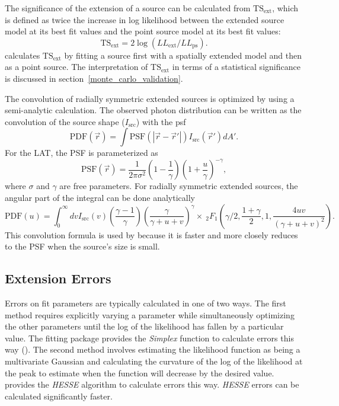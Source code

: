\documentclass[12pt,preprint]{aastex}
\newcommand{\tsext}{{\ensuremath{\text{TS}_\text{ext}}}\xspace}
\newcommand{\pointlike}{\text{\em pointlike}\xspace}
\newcommand{\minuit}{\text{\em Minuit}\xspace}
\begin{document}
The significance of the extension of a source can be calculated from
\tsext, which is defined as twice the increase in log likelihood between
the extended source model at its best fit values and the point source
model at its best fit values:
\begin{equation}
  \tsext=2\log(LL_\text{ext}/LL_\text{ps}).
\end{equation}
\pointlike calculates \tsext by fitting a source first with a spatially
extended model and then as a point source.  The interpretation
of \tsext in terms of a statistical significance is discussed in
section~\ref{monte_carlo_validation}.

The convolution of radially symmetric extended sources is optimized by
using a semi-analytic calculation.  The observed photon distribution
can be written as the convolution of the source shape ($I_\text{src}$)
with the psf
\begin{equation}
  \text{PDF}(\vec r) = \int  \text{PSF}(|\vec r - \vec r'|)I_\text{src}(\vec r') d A'.
\end{equation}
For the LAT, the PSF is parameterized as
\begin{equation}
  \text{PSF}(\vec r) = 
  \frac{1}{2\pi\sigma^2}
  \left(1-\frac{1}{\gamma}\right)
  \left(1+\frac{u}{\gamma}\right)^{-\gamma},
\end{equation}
where $\sigma$ and $\gamma$ are free parameters.  For radially symmetric
extended sources, the angular part of the integral can be done analytically
\begin{equation}
  \text{PDF}(u)= \int_0^\infty dv
  I_\text{src}(v) 
  \left(\frac{\gamma-1}{\gamma}\right)
  \left( \frac{\gamma}{\gamma + u + v}\right)^\gamma 
  \times ~_2F_1 \left(\gamma/2,\frac{1+\gamma}{2},1,\frac{4uv}{(\gamma+u+v)^2}\right).
\end{equation}
This convolution formula is used by \pointlike because it is faster
and more closely reduces to the PSF when the source's size is 
small.

\subsection{Extension Errors}
\label{extension_error}

Errors on fit parameters are typically calculated in one of two
ways. The first method requires explicitly varying a parameter
while simultaneously optimizing the other parameters
until the log of the likelihood has fallen by a particular value.
The \minuit fitting
package provides the {\em Simplex} function to calculate errors this way
(\cite{minuit_documentation}).  The second method involves estimating the
likelihood function as being a multivariate Gaussian and calculating the
curvature of the log of the likelihood at the peak to estimate when the
function will decrease by the desired value. \minuit provides the {\em HESSE}
algorithm to calculate errors this way.  {\em HESSE} errors 
can be calculated significantly faster.
\end{document}

